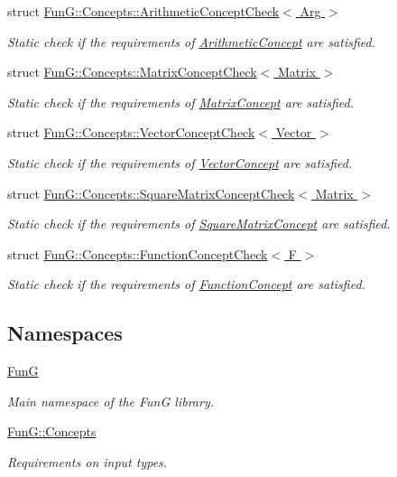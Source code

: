 \begin{DoxyCompactItemize}
struct \hyperlink{structFunG_1_1Concepts_1_1ArithmeticConceptCheck}{Fun\+G\+::\+Concepts\+::\+Arithmetic\+Concept\+Check$<$ Arg $>$}
\begin{DoxyCompactList}\small\item\em Static check if the requirements of \hyperlink{structFunG_1_1Concepts_1_1ArithmeticConcept}{Arithmetic\+Concept} are satisfied. \end{DoxyCompactList}\item 
struct \hyperlink{structFunG_1_1Concepts_1_1MatrixConceptCheck}{Fun\+G\+::\+Concepts\+::\+Matrix\+Concept\+Check$<$ Matrix $>$}
\begin{DoxyCompactList}\small\item\em Static check if the requirements of \hyperlink{structFunG_1_1Concepts_1_1MatrixConcept}{Matrix\+Concept} are satisfied. \end{DoxyCompactList}\item 
struct \hyperlink{structFunG_1_1Concepts_1_1VectorConceptCheck}{Fun\+G\+::\+Concepts\+::\+Vector\+Concept\+Check$<$ Vector $>$}
\begin{DoxyCompactList}\small\item\em Static check if the requirements of \hyperlink{structFunG_1_1Concepts_1_1VectorConcept}{Vector\+Concept} are satisfied. \end{DoxyCompactList}\item 
struct \hyperlink{structFunG_1_1Concepts_1_1SquareMatrixConceptCheck}{Fun\+G\+::\+Concepts\+::\+Square\+Matrix\+Concept\+Check$<$ Matrix $>$}
\begin{DoxyCompactList}\small\item\em Static check if the requirements of \hyperlink{structFunG_1_1Concepts_1_1SquareMatrixConcept}{Square\+Matrix\+Concept} are satisfied. \end{DoxyCompactList}\item 
struct \hyperlink{structFunG_1_1Concepts_1_1FunctionConceptCheck}{Fun\+G\+::\+Concepts\+::\+Function\+Concept\+Check$<$ F $>$}
\begin{DoxyCompactList}\small\item\em Static check if the requirements of \hyperlink{structFunG_1_1Concepts_1_1FunctionConcept}{Function\+Concept} are satisfied. \end{DoxyCompactList}\end{DoxyCompactItemize}
\subsection*{Namespaces}
\begin{DoxyCompactItemize}
\item 
 \hyperlink{namespaceFunG}{FunG}
\begin{DoxyCompactList}\small\item\em Main namespace of the FunG library. \end{DoxyCompactList}\item 
 \hyperlink{namespaceFunG_1_1Concepts}{Fun\+G\+::\+Concepts}
\begin{DoxyCompactList}\small\item\em Requirements on input types. \end{DoxyCompactList}\end{DoxyCompactItemize}
